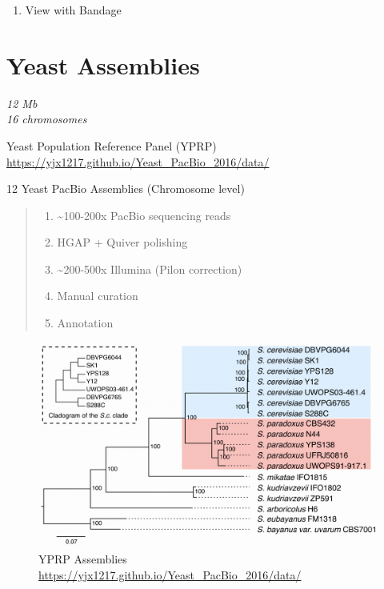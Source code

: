 \documentclass[
]{book}
\providecommand{\tightlist}{%
  \setlength{\itemsep}{0pt}\setlength{\parskip}{0pt}}
\begin{document}
\begin{enumerate}
\def\labelenumi{\arabic{enumi}.}
\setcounter{enumi}{2}
\tightlist
\item
  View with Bandage
\end{enumerate}

\hypertarget{yeast-assemblies}{%
\section{Yeast Assemblies}\label{yeast-assemblies}}

\emph{12 Mb}\\
\emph{16 chromosomes}

Yeast Population Reference Panel (YPRP) \url{https://yjx1217.github.io/Yeast_PacBio_2016/data/}

12 Yeast PacBio Assemblies (Chromosome level)

\begin{quote}
\begin{enumerate}
\def\labelenumi{\arabic{enumi}.}
\tightlist
\item
  \textasciitilde100-200x PacBio sequencing reads
\item
  HGAP + Quiver polishing\\
\item
  \textasciitilde200-500x Illumina (Pilon correction)\\
\item
  Manual curation\\
\item
  Annotation
\end{enumerate}
\end{quote}

\begin{figure}
\centering
\includegraphics[width=1\textwidth,height=\textheight]{./Figures/Yeast.png}
\caption{YPRP Assemblies \url{https://yjx1217.github.io/Yeast_PacBio_2016/data/}}
\end{figure}
\end{document}
